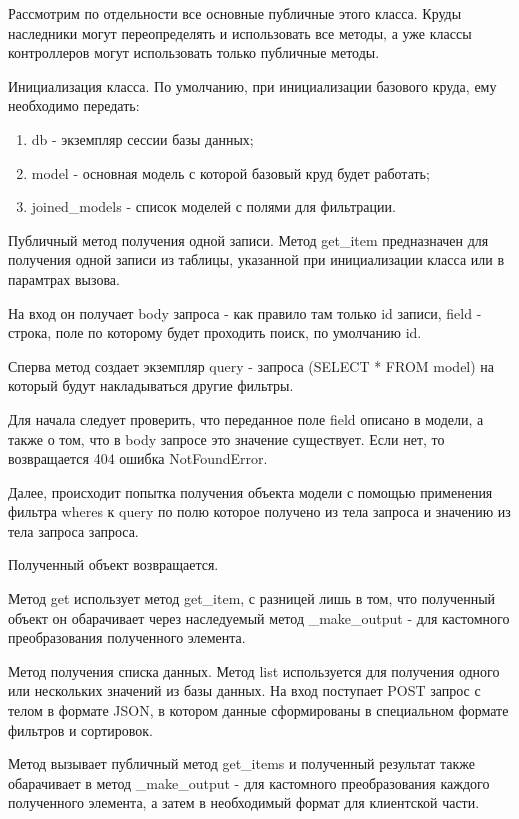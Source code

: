 \documentclass[a4paper,14pt,oneside]{extreport}
\begin{document}
Рассмотрим по отдельности все основные публичные этого класса. Круды наследники могут переопределять и использовать все методы, а уже классы контроллеров могут использовать только публичные методы.

Инициализация класса. По умолчанию, при инициализации базового круда, ему необходимо передать:

\begin{enumerate}[label=\arabic*)]
    \item db - экземпляр сессии базы данных;
    \item model - основная модель с которой базовый круд будет работать;
    \item joined\_models - список моделей с полями для фильтрации.
\end{enumerate}

Публичный метод получения одной записи. Метод get\_item предназначен для получения одной записи из таблицы, указанной при инициализации класса или в парамтрах вызова. 

На вход он получает body запроса - как правило там только id записи,
field - строка, поле по которому будет проходить поиск, по умолчанию id.

Сперва метод создает экземпляр query - запроса (SELECT * FROM model) на который будут накладываться другие фильтры.

Для начала следует проверить, что переданное поле field описано в модели, а также о том, что в body запросе это значение существует.
Если нет, то возвращается 404 ошибка NotFoundError.

Далее, происходит попытка получения объекта модели с помощью применения фильтра wheres к query по полю которое получено из тела запроса и значению из тела запроса запроса.

Полученный объект возвращается.

Метод get использует метод get\_item, с разницей лишь в том, что полученный объект он обарачивает через наследуемый метод \_make\_output - для кастомного преобразования полученного элемента.

Метод получения списка данных. Метод list используется для получения одного или нескольких значений из базы данных. 
На вход поступает POST запрос с телом в формате JSON, в котором данные сформированы в специальном формате фильтров и сортировок.

Метод вызывает публичный метод get\_items и полученный результат также обарачивает в метод \_make\_output - для кастомного преобразования каждого полученного элемента, а затем в необходимый формат для клиентской части.
\end{document}
